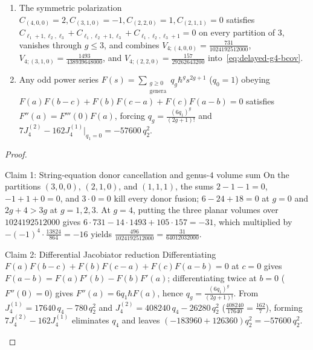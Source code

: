 \begin{lemma}
\label{lem:bcov-donor-moyal}
\leavevmode
\begin{enumerate}[label=(\arabic*),leftmargin=*]
  \item The symmetric polarization $C_{(4,0,0)}=2, C_{(3,1,0)}=-1, C_{(2,2,0)}=1, C_{(2,1,1)}=0$ satisfies $C_{\ell_1+1,\ell_2,\ell_3}+C_{\ell_1,\ell_2+1,\ell_3}+C_{\ell_1,\ell_2,\ell_3+1} = 0$ on every partition of $3$, vanishes through $g \le 3$, and combines $V_{4;(4,0,0)} = \frac{731}{1024192512000}$, $V_{4;(3,1,0)} = \frac{1493}{438939648000}$, and $V_{4;(2,2,0)} = \frac{157}{29262643200}$ into~\eqref{eq:delayed-g4-bcov}.

  \item Any odd power series $F(s) = \sum_{\substack{g\ge 0\\\mathrm{genera}}}q_g\hbar^g s^{2g+1}$ ($q_0 = 1$) obeying $F(a)F(b-c) + F(b)F(c-a) + F(c)F(a-b) = 0$ satisfies $F''(a) = F'''(0)F(a)$, forcing $q_g = \frac{(6q_1)^g}{(2g+1)!}$ and $7J_4^{(2)} - 162J_4^{(1)}|_{q_1=0} = -57600\,q_2^2$.
\end{enumerate}
\end{lemma}

\begin{proof}\leavevmode
\begin{proofpart}{Claim 1: String-equation donor cancellation and genus-$4$ volume sum}
On the partitions $(3,0,0)$, $(2,1,0)$, and $(1,1,1)$, the sums $2 - 1 - 1 = 0$, $-1 + 1 + 0 = 0$, and $3\cdot 0 = 0$ kill every donor fusion; $6 - 24 + 18 = 0$ at $g=0$ and $2g+4 > 3g$ at $g=1,2,3$. At $g=4$, putting the three planar volumes over $1024192512000$ gives $6\cdot 731 - 14\cdot 1493 + 105\cdot 157 = -31$, which multiplied by $-(-1)^4\cdot\frac{13824}{864} = -16$ yields $\frac{496}{1024192512000} = \frac{31}{64012032000}$.
\end{proofpart}
\begin{proofpart}{Claim 2: Differential Jacobiator reduction}
Differentiating $F(a)F(b-c)+F(b)F(c-a)+F(c)F(a-b)=0$ at $c=0$ gives $F(a-b) = F(a)F'(b) - F(b)F'(a)$; differentiating twice at $b=0$ ($F''(0)=0$) gives $F''(a) = 6q_1\hbar F(a)$, hence $q_g = \frac{(6q_1)^g}{(2g+1)!}$. From $J_4^{(1)} = 17640\,q_4 - 780\,q_2^2$ and $J_4^{(2)} = 408240\,q_4 - 26280\,q_2^2$ ($\frac{408240}{17640} = \frac{162}{7}$), forming $7J_4^{(2)} - 162J_4^{(1)}$ eliminates $q_4$ and leaves $(-183960 + 126360)q_2^2 = -57600\,q_2^2$.
\end{proofpart}
\end{proof}

